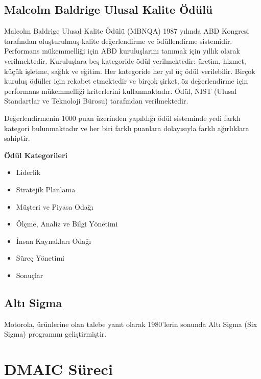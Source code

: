 \documentclass[
]{book}
\providecommand{\tightlist}{%
  \setlength{\itemsep}{0pt}\setlength{\parskip}{0pt}}
\begin{document}
\hypertarget{malcolm-baldrige-ulusal-kalite-uxf6duxfcluxfc}{%
\section{Malcolm Baldrige Ulusal Kalite Ödülü}\label{malcolm-baldrige-ulusal-kalite-uxf6duxfcluxfc}}

Malcolm Baldrige Ulusal Kalite Ödülü (MBNQA) 1987 yılında ABD Kongresi tarafından oluşturulmuş kalite değerlendirme ve ödüllendirme sistemidir. Performans mükemmelliği için ABD kuruluşlarını tanımak için yıllık olarak verilmektedir. Kuruluşlara beş kategoride ödül verilmektedir: üretim, hizmet, küçük işletme, sağlık ve eğitim. Her kategoride her yıl üç ödül verilebilir. Birçok kuruluş ödüller için rekabet etmektedir ve birçok şirket, öz değerlendirme için performans mükemmelliği kriterlerini kullanmaktadır. Ödül, NIST (Ulusal Standartlar ve Teknoloji Bürosu) tarafından verilmektedir.

Değerlendirmenin 1000 puan üzerinden yapıldığı ödül sisteminde yedi farklı kategori bulunmaktadır ve her biri farklı puanlara dolayısıyla farklı ağırlıklara sahiptir.

\textbf{Ödül Kategorileri}

\begin{itemize}
\tightlist
\item
  Liderlik
\item
  Stratejik Planlama
\item
  Müşteri ve Piyasa Odağı
\item
  Ölçme, Analiz ve Bilgi Yönetimi
\item
  İnsan Kaynakları Odağı
\item
  Süreç Yönetimi
\item
  Sonuçlar
\end{itemize}

\hypertarget{altux131-sigma}{%
\section{Altı Sigma}\label{altux131-sigma}}

Motorola, ürünlerine olan talebe yanıt olarak 1980'lerin sonunda Altı Sigma (Six Sigma) programını geliştirmiştir.

\hypertarget{dmaic-suxfcreci}{%
\chapter{DMAIC Süreci}\label{dmaic-suxfcreci}}
\end{document}
